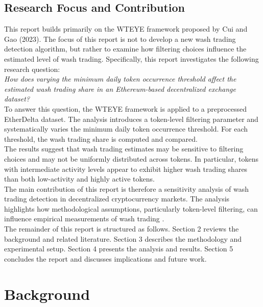\documentclass[language=english,thesis=bachelor,nosecondtitle,faculty=cb,onesided,13pt]{hsmw-thesis}
\begin{document}
	\section{Research Focus and Contribution}
This report builds primarily on the WTEYE framework proposed by Cui and Gao (2023). The focus of this report is not to develop a new wash trading detection algorithm, but rather to examine how filtering choices influence the estimated level of wash trading.
Specifically, this report investigates the following research question: \\
\textit{How does varying the minimum daily token occurrence threshold affect the estimated wash trading share in an Ethereum-based decentralized exchange dataset?} \\
To answer this question, the WTEYE framework is applied to a preprocessed EtherDelta dataset. The analysis introduces a token-level filtering parameter and systematically varies the minimum daily token occurrence threshold. For each threshold, the wash trading share is computed and compared. \\
The results suggest that wash trading estimates may be sensitive to filtering choices and may not be uniformly distributed across tokens. In particular, tokens with intermediate activity levels appear to exhibit higher wash trading shares than both low-activity and highly active tokens. \\
The main contribution of this report is therefore a sensitivity analysis of wash trading detection in decentralized cryptocurrency markets. The analysis highlights how methodological assumptions, particularly token-level filtering, can influence empirical measurements of wash trading \cite{victor2021detecting, cui2023chain}. \\
\newline
The remainder of this report is structured as follows. Section 2 reviews the background and related literature. Section 3 describes the methodology and experimental setup. Section 4 presents the analysis and results. Section 5 concludes the report and discusses implications and future work.

\chapter{Background}
\end{document}
